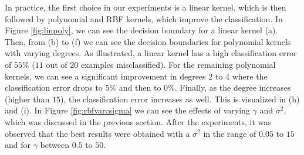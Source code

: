 \documentclass[a4paper, 11pt, one column]{article}
\begin{document}
In practice, the first choice in our experiments is a linear kernel, which is then followed by polynomial and RBF kernels, which improve the classification. In Figure \ref{fig:linpoly}, we can see the decision boundary for a linear kernel (a). Then, from (b) to (f) we can see the decision boundaries for polynomial kernels with varying degrees. As illustrated, a linear kernel has a high classification error of $55\%$ ($11$ out of $20$ examples misclassified). For the remaining polynomial kernels, we can see a significant improvement in degrees $2$ to $4$ where the classification error drops to $5\%$ and then to $0\%$. Finally, as the degree increases (higher than $15$), the classification error increases as well. This is visualized in (h) and (i). In Figure \ref{fig:rbfvarcsigma} we can see the effects of varying $\gamma$ and $\sigma^2$, which was discussed in the previous section. After the experiments, it was observed that the best results were obtained with a $\sigma^2$ in the range of $0.05$ to $15$ and for $\gamma$ between $0.5$ to $50$. 
\end{document}
